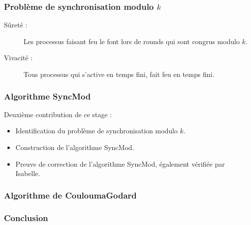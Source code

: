 \documentclass{beamer}
\begin{document}
\begin{frame}
\frametitle{Problème de synchronisation modulo $k$}
	\begin{description}
		\item[Sûreté : ] Les processus faisant feu le font lors de rounds qui sont congrus modulo $k$. 
		\item[Vivacité : ] Tous processus qui s'active en temps fini, fait feu en temps fini. 
	\end{description}
\end{frame}

\begin{frame}
\frametitle{Algorithme SyncMod}
	Deuxième contribution de ce stage : 
	\begin{itemize}
		\item Identification du problème de synchronisation modulo $k$.
		\item Construction de l'algorithme SyncMod.
		\item Preuve de correction de l'algorithme SyncMod, également vérifiée par Isabelle.
	\end{itemize}
\end{frame}


\begin{frame}
\frametitle{Algorithme de Coulouma\-Godard}
\end{frame}

\begin{frame}
\frametitle{Conclusion}
\end{frame}
\end{document}
